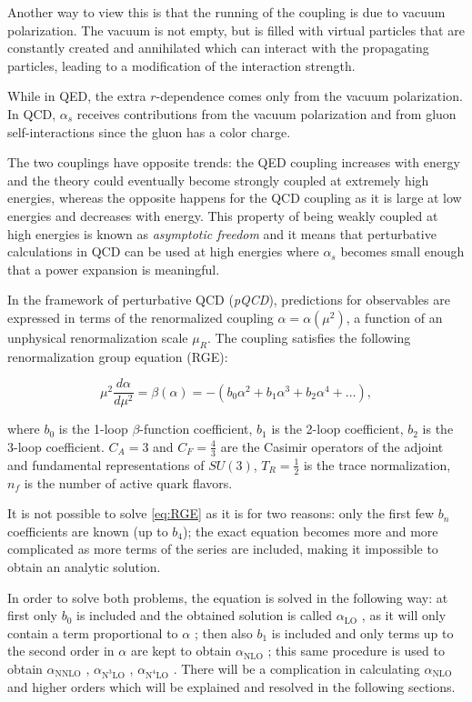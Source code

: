 \documentclass[../Tesi_Jiahao_Miao_986136.tex]{subfiles}
\begin{document}
Another way to view this is that the running of the coupling is due to vacuum polarization. The vacuum is not empty, but is filled 
with virtual particles that are constantly created and annihilated which can interact with the propagating particles,
leading to a modification of the interaction strength. 

While in QED, the extra $r$-dependence comes only from the vacuum polarization. In QCD, 
$\alpha_s$ receives contributions from the vacuum polarization and from gluon self-interactions since the gluon 
has a color charge.

The two couplings have opposite trends: the QED coupling increases with energy and the theory could eventually become strongly
coupled at extremely high energies, whereas the opposite happens for the QCD coupling as it is large at low
energies and decreases with energy. This property of being weakly coupled at high energies is
known as \emph{asymptotic freedom} and it means that perturbative calculations in QCD can be used at high energies where $\alpha_s$ becomes small enough that a power expansion is meaningful.

In the framework of perturbative QCD (\emph{pQCD}), predictions for observables are expressed in
terms of the renormalized coupling $\alpha = \alpha (\mu^2)$, a function of an unphysical renormalization scale
$\mu_R$. 
The coupling satisfies the following renormalization group equation (RGE):

\begin{equation}\label{eq:RGE}
    \mu^2 \frac{d\alpha}{d\mu^2} = \beta(\alpha) = -\left( b_0 \alpha^2 + b_1 \alpha^3 + b_2 \alpha^4 + \ldots \right),
\end{equation}

where $b_0$ is the 1-loop $\beta$-function coefficient,  
$b_1$ is the 2-loop coefficient, 
$b_2$ is the 3-loop coefficient.
$C_A = 3$ and $C_F = \frac{4}{3}$ are the Casimir operators of the adjoint and fundamental representations of $SU(3)$,
$T_R = \frac{1}{2}$ is the trace normalization, $n_f$ is the number of active quark flavors. 

It is not possible to solve \cref{eq:RGE} as it is for two reasons: only the first few $b_n$ 
coefficients are known (up to $b_4$); the exact equation becomes more and more complicated 
as more terms of the series are included, making it impossible to obtain an analytic solution.

In order to solve both problems, the equation is solved in the following way: at first only $b_0$
is included and the obtained solution is called $\alpha_{\text{LO}}$ , as it will only contain a term proportional to
$\alpha$ ; then also $b_1$ is included and only terms up to the second order in $\alpha$ are kept to obtain $\alpha_{\text{NLO}}$ ;
this same procedure is used to obtain $\alpha_{\text{NNLO}}$ , $\alpha_{\text{N}^3\text{LO}}$ , $\alpha_{\text{N}^4\text{LO}}$ . There will be a complication in
calculating $\alpha_{\text{NLO}}$ and higher orders which will be explained and resolved in the following sections.
\end{document}
